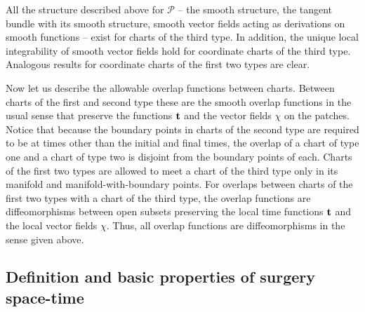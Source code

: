 All the structure described above for ${\mathcal P}$ -- the smooth
structure, the tangent bundle with its smooth structure, smooth
vector fields acting as derivations on smooth functions -- exist for
charts of the third type. In addition, the unique local integrability
of smooth vector fields  hold for coordinate charts of the third
type. Analogous results for coordinate charts of the first two types
are clear.

Now let us describe the allowable overlap functions between charts.
Between charts of the first and second type these are the smooth
overlap functions in the usual sense that preserve the functions
${\bf t}$ and the vector fields $\chi$ on the patches. Notice that
because the boundary points in charts of the second type are
required to be at times other than the initial and final times, the
overlap of a chart of type one and a chart of type two is disjoint
from the boundary points of each. Charts of the first two types are
allowed to meet a chart of the third type only in its manifold and
manifold-with-boundary points. For overlaps between charts of the
first two types with a chart of the third type, the overlap
functions are  diffeomorphisms between open subsets preserving the
local time functions ${\bf t}$ and the local vector fields $\chi$.
Thus, all overlap functions are diffeomorphisms in the sense given
above.

\subsection{Definition and basic properties of surgery space-time}

